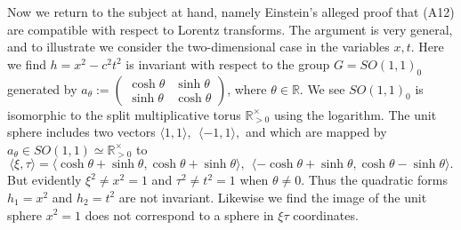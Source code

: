 \documentclass[12pt]{amsart}
\theoremstyle{definition}
\theoremstyle{remark}
\newcommand{\bR}{\mathbb{R}}
\newcommand{\del}{\partial}
\begin{document}
Now we return to the subject at hand, namely Einstein's alleged proof that (A12) are compatible with respect to Lorentz transforms. The argument is very general, and to illustrate we consider the two-dimensional case in the variables $x,t$. Here we find $h=x^2-c^2 t^2$ is invariant with respect to the group $G=SO(1,1)_0$ generated by $a_\theta:=\begin{pmatrix} \cosh \theta & \sinh \theta \\
\sinh \theta & \cosh \theta
\end{pmatrix}$, where $\theta\in \bR$. We see $SO(1,1)_0$ is isomorphic to the split multiplicative torus $\bR^\times _{>0}$ using the logarithm. The unit sphere includes two vectors $\langle 1, 1 \rangle,~~ \langle -1,1\rangle,$ and which are mapped by $a_\theta \in SO(1,1) \simeq \bR^\times_{>0}$ to $$\langle \xi,\tau\rangle=\langle \cosh \theta+\sinh \theta, \cosh \theta+\sinh \theta \rangle,~~ \langle -\cosh \theta+\sinh \theta, \cosh \theta-\sinh \theta \rangle.$$ But evidently $\xi^2 \neq x^2=1$ and $\tau^2 \neq t^2=1$ when $\theta\neq 0$. Thus the quadratic forms $h_1=x^2$ and $h_2=t^2$ are not invariant. Likewise we find the image of the unit sphere $x^2=1$ does not correspond to a sphere in $\xi \tau$ coordinates. %


\end{document}
